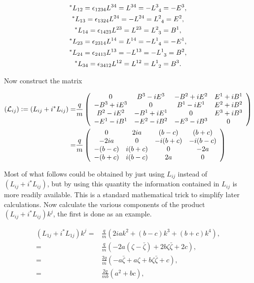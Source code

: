 \begin{gather*}
^*L_{12} = \epsilon_{1234}L^{34} = L^{34} = -\tensor{L}{^3_4} = -E^3, \\
^*L_{13} = \epsilon_{1324}L^{24} = - L^{24} = \tensor{L}{^2_4} = E^2,  \\
^*L_{14} = \epsilon_{1423}L^{23} = L^{23} = \tensor{L}{^2_3} =  B^1, \\
^*L_{23} = \epsilon_{2314}L^{14} = L^{14} = -\tensor{L}{^1_4} = -E^1, \\
^*L_{24} = \epsilon_{2413}L^{13} = -L^{13} =- \tensor{L}{^1_3} =  B^2,\\
^*L_{34} = \epsilon_{3412}L^{12} = L^{12} = \tensor{L}{^1_2} = B^3. \\
\end{gather*}

\noindent Now construct the matrix

\begin{align*}
\left( \mathcal{L}_{ij} \right) \vcentcolon = (L_{ij} + i ^*L_{ij}) = &
\frac{q}{m}
\left(
\begin{array}{cccc}
0           & B^3 - iE^3 & -B^2 + i E^2 & E^1 +iB^1 \\
-B^3+iE^3   & 0          & B^1 - i E^1  & E^2+iB^2 \\
B^2-iE^2    & -B^1 +iE^1 & 0            & E^3+iB^3 \\
-E^1 - iB^1 & -E^2-iB^2  & -E^3-iB^3    & 0        \\
\end{array}
\right) \\
= & 
\frac{q}{m}
\left(
\begin{array}{cccc}
0      & 2ia    & (b-c)   & (b+c)   \\
-2ia   & 0      & -i(b+c) & -i(b-c) \\
-(b-c) & i(b+c) & 0       & -2a     \\
-(b+c) & i(b-c) & 2a      & 0       \\
\end{array}
\right)
\end{align*}

\noindent Most of what follows could be obtained by just using $L_{ij}$ instead of $(L_{ij} + i ^*L_{ij})$, but by using this quantity the information contained in $L_{ij}$ is more readily available. This is a standard mathematical trick to simplify later calculations. Now calculate the various components of the product $(L_{ij} + i ^*L_{ij}) k^j$, the first is done as an example. 

\begin{align*}
(L_{1j} + i ^*L_{1j}) k^j = & \frac{q}{m} (2iak^2 + (b-c)k^3 + (b+c)k^4), \\
                         = &\frac{q}{m} (-2a(\zeta - \bar{\zeta}) + 2b\zeta\bar{\zeta} + 2c), \\
                         = &\frac{2q}{m} (-a\bar{\zeta} + a\zeta + b\zeta\bar{\zeta} +c), \\
                         = &\frac{2q}{mb} (a^2 + bc), 
\end{align*}

